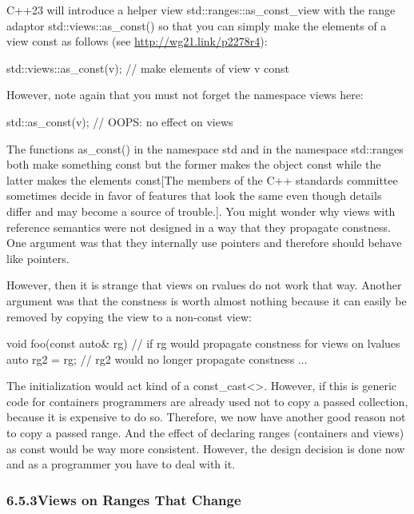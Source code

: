 C++23 will introduce a helper view std::ranges::as\_const\_view with the range adaptor std::views::as\_const() so that you can simply make the elements of a view const as follows (see \url{http://wg21.link/p2278r4}):

\begin{cpp}
std::views::as_const(v); // make elements of view v const
\end{cpp}

However, note again that you must not forget the namespace views here:

\begin{cpp}
std::as_const(v); // OOPS: no effect on views
\end{cpp}

The functions as\_const() in the namespace std and in the namespace std::ranges both make something const but the former makes the object const while the latter makes the elements const[The members of the C++ standards committee sometimes decide in favor of features that look the same even though details differ and may become a source of trouble.]. You might wonder why views with reference semantics were not designed in a way that they propagate constness. One argument was that they internally use pointers and therefore should behave like pointers.

However, then it is strange that views on rvalues do not work that way. Another argument was that the constness is worth almost nothing because it can easily be removed by copying the view to a non-const view:

\begin{cpp}
void foo(const auto& rg) // if rg would propagate constness for views on lvalues
{
	auto rg2 = rg; // rg2 would no longer propagate constness
	...
}
\end{cpp}

The initialization would act kind of a const\_cast<>. However, if this is generic code for containers programmers are already used not to copy a passed collection, because it is expensive to do so. Therefore, we now have another good reason not to copy a passed range. And the effect of declaring ranges (containers and views) as const would be way more consistent. However, the design decision is done now and as a programmer you have to deal with it.

\subsubsection*{ 6.5.3\hspace{0.2cm}Views on Ranges That Change}

